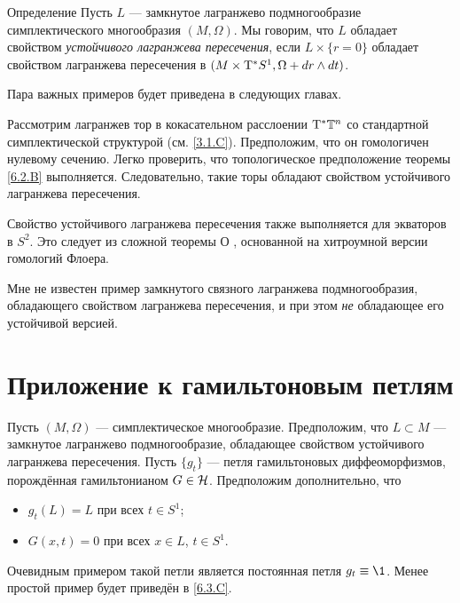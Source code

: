 \begin{ex}{Определение}\label{6.2.C}
Пусть $L$ — замкнутое лагранжево подмногообразие симплектического многообразия $(M, \Omega)$.
Мы говорим, что $L$ обладает свойством \emph{устойчивого лагранжева пересечения}, если $L \times \{r = 0\}$ обладает свойством лагранжева пересечения в $(M \z\times \T^\ast S^1, \Omega + \d r \wedge \d t)$.
\end{ex}

Пара важных примеров будет приведена в следующих главах.

\begin{ex}{}\label{6.2.D}
Рассмотрим лагранжев тор в кокасательном расслоении $\mathrm{T}^\ast \mathbb{T}^n$ со стандартной симплектической структурой (см. \ref{3.1.C}).
Предположим, что он гомологичен нулевому сечению.
Легко проверить, что топологическое предположение теоремы \ref{6.2.B} выполняется.
Следовательно, такие торы обладают свойством устойчивого лагранжева пересечения.
\end{ex}




\begin{ex}[Экватор на $S^2$.]{}\label{6.2.E}
Свойство устойчивого лагранжева пересечения также выполняется для экваторов в $S^2$.
Это следует из сложной теоремы О \cite{O1,O2}, основанной на хитроумной версии гомологий Флоера.
\end{ex}


Мне не известен пример замкнутого связного лагранжева подмногообразия, обладающего свойством лагранжева пересечения, и при этом \emph{не} обладающее его устойчивой версией.


\section{Приложение к гамильтоновым петлям}

Пусть $(M, \Omega)$ — симплектическое многообразие.
Предположим, что $L \subset M$ — замкнутое лагранжево подмногообразие, обладающее свойством устойчивого лагранжева пересечения.  
Пусть $\{g_t\}$ — петля гамильтоновых диффеоморфизмов, порождённая
гамильтонианом $G \in \mathcal{H}$. 
Предположим дополнительно, что
\begin{itemize}
\item $g_t (L) = L$ при всех $t \in S^1$; 
\item $G (x, t) = 0$ при всех $x \in L$, $t \in S^1$.
\end{itemize}
Очевидным примером такой петли является постоянная петля $g_t \z\equiv \1$.
Менее простой пример будет приведён в \ref{6.3.C}.

